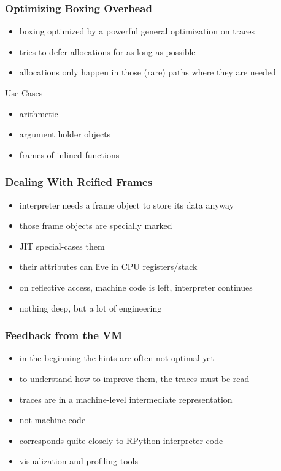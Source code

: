 \documentclass[utf8x]{beamer}
\begin{document}
\begin{frame}
  \frametitle{Optimizing Boxing Overhead}
  \begin{itemize}
      \item boxing optimized by a powerful general optimization on traces
      \item tries to defer allocations for as long as possible
      \item allocations only happen in those (rare) paths where they are needed
  \end{itemize}
  \pause
  \begin{block}{Use Cases}
      \begin{itemize}
          \item arithmetic
          \item argument holder objects
          \item frames of inlined functions
      \end{itemize}
  \end{block}
\end{frame}

\begin{frame}
  \frametitle{Dealing With Reified Frames}
  \begin{itemize}
      \item interpreter needs a frame object to store its data anyway
      \item those frame objects are specially marked
      \item JIT special-cases them
      \item their attributes can live in CPU registers/stack
      \item on reflective access, machine code is left, interpreter continues
      \pause
      \item nothing deep, but a lot of engineering
  \end{itemize}
\end{frame}

\begin{frame}
  \frametitle{Feedback from the VM}
  \begin{itemize}
      \item in the beginning the hints are often not optimal yet
      \item to understand how to improve them, the traces must be read
      \item traces are in a machine-level intermediate representation
      \item not machine code
      \item corresponds quite closely to RPython interpreter code
      \item visualization and profiling tools
  \end{itemize}
\end{frame}
\end{document}
